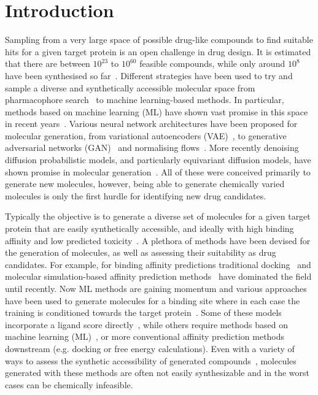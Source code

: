 \documentclass[journal=jacsat,manuscript=article]{achemso}
\begin{document}
\section{Introduction}
\label{sec:intro}
Sampling from a very large space of possible drug-like compounds to find suitable hits for a given target protein is an open challenge in drug design. It is estimated that there are between $10^{23}$ to $10^{60}$ feasible compounds, while only around $10^8$ have been synthesised so far~\cite{polishchuk2013estimation, reymond2012exploring}. Different strategies have been used   to try and sample a diverse and synthetically accessible molecular space from pharmacophore search~\cite{schwab2010conformations} to machine learning-based methods. In particular, methods based on machine learning (ML) have shown vast promise in this space in recent years~\cite{bilodeau2022generative}. Various neural network architectures have been proposed for molecular generation, from variational autoencoders (VAE)~\cite{kingma2022autoencoding, jin2018junction, ma2018constrained, ragoza2022generating}, to generative adversarial networks (GAN)~\cite{hoffmann2019generating} and normalising flows~\cite{shi2021learning}. More recently denoising diffusion probabilistic models, and particularly equivariant diffusion models, have shown promise in molecular generation~\cite{xu2022geodiff, hoogeboom2022equivariant}. All of these were conceived primarily to generate new molecules, however, being able to generate chemically varied molecules is only the first hurdle for identifying new drug candidates.

Typically the objective is to generate a diverse set of molecules for a given target protein that are easily synthetically accessible, and ideally with high binding affinity and low predicted toxicity~\cite{prieto-martinez2019chapter}. A plethora of methods have been devised for the generation of molecules, as well as assessing their suitability as drug candidates. For example, for binding affinity predictions traditional docking~\cite{fu2018predictive} and molecular simulation-based affinity prediction methods~\cite{mey2016blinded,mey2020best} have dominated the field until recently. Now ML methods are gaining momentum and various approaches have been used to generate molecules for a binding site where in each case the training is conditioned towards the target protein~\cite{xie2022advances}. Some of these models incorporate a ligand score directly~\cite{ragoza2022generating}, while others require methods based on machine learning (ML)~\cite{masters2023deep}, or more conventional affinity prediction methods downstream (e.g. docking or free energy calculations). Even with a variety of ways to assess the synthetic accessibility of generated compounds~\cite{coley2018scscore, thakkar2021retrosynthetic}, molecules generated with these methods are often not easily synthesizable and in the worst cases can be chemically infeasible. 
\end{document}
